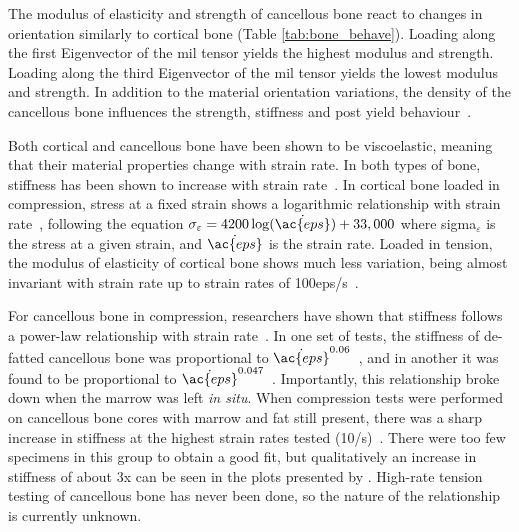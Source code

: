 The modulus of elasticity and strength of cancellous bone react to changes in orientation similarly to cortical bone (Table \ref{tab:bone_behave}).
Loading along the first Eigenvector of the \ac{mil} tensor yields the highest modulus and strength.
Loading along the third Eigenvector of the \ac{mil} tensor yields the lowest modulus and strength.
In addition to the material orientation variations, the density of the cancellous bone influences the strength, stiffness and post yield behaviour~\citep{carter_compressive_1977, rincon-kohli_multi-axial_2009}.

Both cortical and cancellous bone have been shown to be viscoelastic, meaning that their material properties change with strain rate.
In both types of bone, stiffness has been shown to increase with strain rate~\citep{crowninshield_response_1974, evans_response_1992, pithioux_comparison_2004, carter_compressive_1977, carter_bone_1976, currey_effects_1975}.
In cortical bone loaded in compression, stress at a fixed strain shows a logarithmic relationship with strain rate~\cite{mcelhaney_dynamic_1966}, following the equation $\sigma_\varepsilon = 4200 \log (\dot{\ac{eps}}) + 33,000$ where \acs{sigma}$_\varepsilon$ is the stress at a given strain, and $\dot{\ac{eps}}$ is the strain rate.
Loaded in tension, the modulus of elasticity of cortical bone shows much less variation, being almost invariant with strain rate up to strain rates of 100\ac{eps}/\ac{s}~\citep{crowninshield_response_1974}.

For cancellous bone in compression, researchers have shown that stiffness follows a power-law relationship with strain rate~\citep{carter_compressive_1977, linde_mechanical_1991}.
In one set of tests, the stiffness of de-fatted cancellous bone was proportional to $ \dot{\ac{eps}}^{0.06} $~\citep{carter_compressive_1977}, and in another it was found to be proportional to $ \dot{\ac{eps}}^{0.047} $~\citep{linde_mechanical_1991}.
Importantly, this relationship broke down when the marrow was left \textit{in situ}.
When compression tests were performed on cancellous bone cores with marrow and fat still present, there was a sharp increase in stiffness at the highest strain rates tested (10/\ac{s})~\citep{carter_compressive_1977}.
There were too few specimens in this group to obtain a good fit, but qualitatively an increase in stiffness of about 3x can be seen in the plots presented by \citet{carter_compressive_1977}.
High-rate tension testing of cancellous bone has never been done, so the nature of the relationship is currently unknown.

